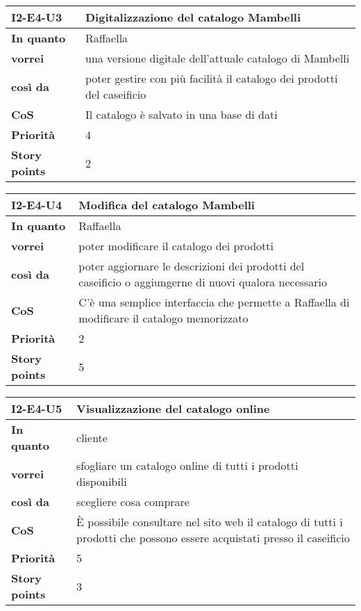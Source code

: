 \begin{table}[H]
  \begin{tabularx}{\textwidth}{lX}
    \toprule
    \textbf{I2-E4-U3} & \textbf{Digitalizzazione del catalogo Mambelli} \\
    \midrule
    \textbf{In quanto} & Raffaella \\
    \textbf{vorrei} & una versione digitale dell'attuale catalogo di Mambelli \\
    \textbf{così da} & poter gestire con più facilità il catalogo dei prodotti del caseificio \\
    \midrule
    \textbf{CoS} & Il catalogo è salvato in una base di dati \\
    \midrule
    \textbf{Priorità} & 4 \\
    \textbf{Story points} & 2 \\
    \bottomrule
  \end{tabularx}
  \label{user-story:i2-e4-u3}
\end{table}

\begin{table}[H]
  \begin{tabularx}{\textwidth}{lX}
    \toprule
    \textbf{I2-E4-U4} & \textbf{Modifica del catalogo Mambelli} \\
    \midrule
    \textbf{In quanto} & Raffaella \\
    \textbf{vorrei} & poter modificare il catalogo dei prodotti \\
    \textbf{così da} & poter aggiornare le descrizioni dei prodotti del caseificio o aggiungerne di nuovi qualora necessario \\
    \midrule
    \textbf{CoS} & C'è una semplice interfaccia che permette a Raffaella di modificare il catalogo memorizzato \\
    \midrule
    \textbf{Priorità} & 2 \\
    \textbf{Story points} & 5 \\
    \bottomrule
  \end{tabularx}
  \label{user-story:i2-e4-u4}
\end{table}

\begin{table}[H]
  \begin{tabularx}{\textwidth}{lX}
    \toprule
    \textbf{I2-E4-U5} & \textbf{Visualizzazione del catalogo online} \\
    \midrule
    \textbf{In quanto} & cliente \\
    \textbf{vorrei} & sfogliare un catalogo online di tutti i prodotti disponibili \\
    \textbf{così da} & scegliere cosa comprare \\
    \midrule
    \textbf{CoS} & È possibile consultare nel sito web il catalogo di tutti i prodotti che possono essere acquistati presso il caseificio \\
    \midrule
    \textbf{Priorità} & 5 \\
    \textbf{Story points} & 3 \\
    \bottomrule
  \end{tabularx}
  \label{user-story:i2-e4-u5}
\end{table}

